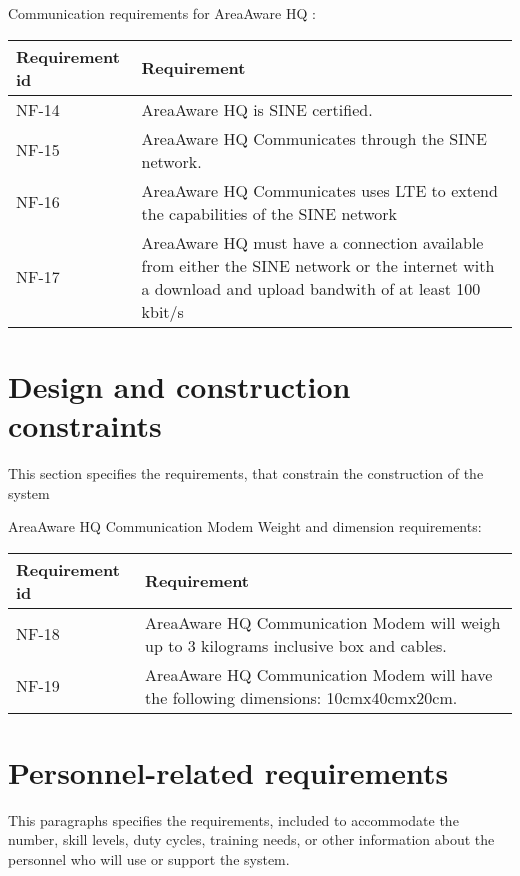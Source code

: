 Communication requirements for AreaAware HQ :
\begin{longtable}{| p{3.2cm} |  p{10cm} | }
	\hline
	\textbf{Requirement id} &  \textbf{Requirement } \\
	\hline
	NF-14 & AreaAware HQ is SINE certified.  \\
	\hline
	NF-15 & AreaAware HQ Communicates through the SINE network. \\
	\hline
	NF-16 & AreaAware HQ Communicates uses LTE to extend the capabilities of the SINE network \\
	\hline
	NF-17 & AreaAware HQ must have a connection available from either the SINE network or the internet with a download and upload bandwith of at least 100 kbit/s \\
	\hline
\end{longtable}




\label{sec_nonFunc5}
\section{Design and construction constraints}
This section specifies the requirements, that constrain the construction of the system

AreaAware HQ Communication Modem Weight and dimension requirements:
\begin{longtable}{| p{3.2cm} |  p{10cm} | }
	\hline
	\textbf{Requirement id} &  \textbf{Requirement } \\
	\hline
	NF-18 & AreaAware HQ Communication Modem will weigh up to 3 kilograms inclusive box and cables.  \\
	\hline
	NF-19 & AreaAware HQ Communication Modem will have the following dimensions: 10cmx40cmx20cm. \\
	\hline
\end{longtable}

\label{sec_nonFunc6}
\section{Personnel-related requirements}
This paragraphs specifies the requirements, included to accommodate the number, skill levels, duty cycles, training needs, or other information about the personnel who will use or support the system.


